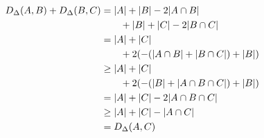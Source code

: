 \documentclass[10pt,a4paper,boxed]{hmcpset}
\begin{document}
\begin{solution}
\begin{enumerate}[(i)]
\begin{description}
							\begin{align}
								D_\Delta(A,B) + D_\Delta(B,C) &= |A| + |B| - 2|A \cap B| \notag\\ & \qquad + |B| + |C| - 2 |B \cap C| \\
								& = |A| + |C| \notag \\ & \qquad + 2 ( -( |A \cap B| + |B \cap C| ) + |B|) \\
								& \geq |A| + |C| \notag \\ & \qquad + 2 ( - (|B| + |A\cap B \cap C| ) + |B|) \\
								& = |A| + |C| - 2 |A \cap B \cap C| \\
								& \geq |A| + |C| - |A \cap C| \\
							  & = D_\Delta(A,C)
							\end{align}

					\end{description}
			\end{enumerate}
		\end{solution}

	
\end{document}
